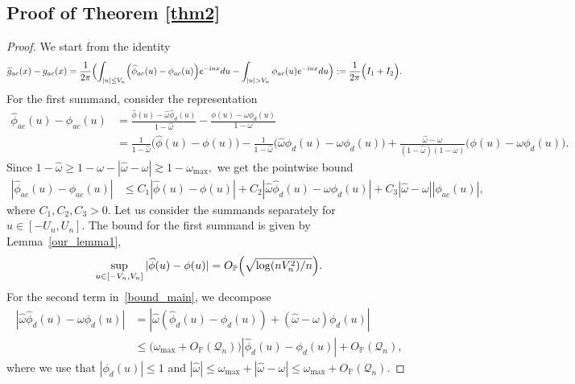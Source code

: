\documentclass[numbers,webpdf,imaiai]{ima-authoring-template}%
\theoremstyle{thmstyletwo}%
\renewcommand{\i}{\mathrm{i}}
\renewcommand{\P}{\mathbb{P}}
\newcommand{\w}{\omega}
\newcommand{\mQ}{\mathcal{Q}}
\numberwithin{equation}{section}
\begin{document}
\subsection{Proof of Theorem \ref{thm2}}

\begin{proof}

We start from the identity
\begin{align*}
 \widehat{g}_{ac}(x) -  g_{ac}(x) &= \frac{1}{2 \pi}\Bigl( \int_{|u| \leq V_n} \Bigl( \widehat{\phi}_{ac}(u) - \phi_{ac}(u)  \Bigr) e^{-\i u x}  du 
 - \int_{|u| >V_n} \phi_{ac}(u)  e^{-\i u x}  du\Bigr):=\frac{1}{2 \pi}\Bigl(I_1 + I_2\Bigr).
\end{align*}
For the first summand, consider the representation 
\begin{align*}
    \widehat{\phi}_{ac}(u) - \phi_{ac}(u) 
   &= \frac{\widehat{\phi}(u) - \widehat{\w} \widehat{\phi}_d(u)}{1 - \widehat{\w}} - \frac{\phi(u) - \w \phi_d(u)}{1 - \w} \nonumber\\
       &= \frac{1}{1-\widehat\w} \bigl( \widehat{\phi}(u) - \phi(u) \bigr) 
       - \frac{1}{1-\widehat\w} \bigl( \widehat{\w} \widehat{\phi}_d(u) - \w \phi_d(u) \bigr) + \frac{\widehat{\w} - \w}{(1-\widehat{\w})(1-\w)} \bigl( \phi (u) - \w \phi_d(u) \bigr). 
\end{align*}
Since \(1-\widehat{\w} \geq 1 - \w-|\widehat{\w} - \w| \gtrsim 1 - \w_{\max},\) we get the pointwise bound
\begin{align}\label{bound_main}
    |\widehat{\phi}_{ac}(u) - \phi_{ac}(u)| 
    &\le C_1 |\widehat{\phi}(u) - \phi(u)| 
       + C_2 |\widehat{\w} \widehat{\phi}_d(u) - \w \phi_d(u)| 
       + C_3 |\widehat{\w} - \w| |\phi_{ac}(u)|, 
\end{align}
where $C_1, C_2, C_3>0.$ Let us consider the summands separately for \(u \in [-U_n, U_n]\). The bound for the first summand is given by Lemma~\ref{our_lemma1},
\begin{align*}
\sup_{u \in [-V_n, V_n]} |\widehat{\phi}(u) - \phi(u)| = O_{\P} \Bigl( 
        \sqrt{
\log(n V_n^2) / n
}
        \Bigr).
\end{align*}
For the second term in~\eqref{bound_main}, we decompose
\begin{align}\nonumber
|
    \widehat{\w} \widehat{\phi}_d(u) - \w \phi_d(u) 
    |
    &= |\widehat{\w} (\widehat{\phi}_d(u) - \phi_d(u)) + (\widehat{\w} - \w) \phi_d(u)|\\
     &\leq \bigl(\w_{\max}+O_{\P}(\mQ_n)\bigr)|\widehat{\phi}_d(u) - \phi_d(u)| + O_{\P}(\mQ_n),\label{bound_discrete}
\end{align}
where we use that $|\phi_d(u)| \le 1$ and $|\widehat{\w}| \leq \w_{\max} + |\widehat{\w} - \w| \leq \w_{\max}+O_{\P}(\mQ_n)$.


\end{proof}
\end{document}
